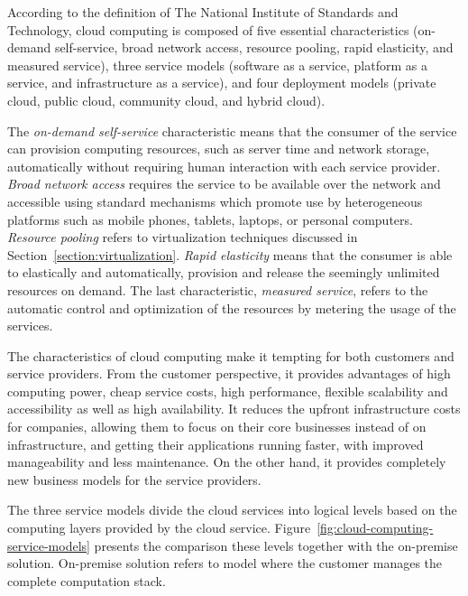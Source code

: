 According to the definition of The National Institute of Standards and Technology, cloud computing is composed of five essential characteristics (on-demand self-service, broad network access, resource pooling, rapid elasticity, and measured service), three service models (software as a service, platform as a service, and infrastructure as a service), and four deployment models (private cloud, public cloud, community cloud, and hybrid cloud).~\cite{Mell:2011:ccdef}

The \emph{on-demand self-service} characteristic means that the consumer of the service can provision computing resources, such as server time and network storage, automatically without requiring human interaction with each service provider. \emph{Broad network access} requires the service to be available over the network and accessible using standard mechanisms which promote use by heterogeneous platforms such as mobile phones, tablets, laptops, or personal computers. \emph{Resource pooling} refers to virtualization techniques discussed in Section~\ref{section:virtualization}. \emph{Rapid elasticity} means that the consumer is able to elastically and automatically, provision and release the seemingly unlimited resources on demand. The last characteristic, \emph{measured service}, refers to the automatic control and optimization of the resources by metering the usage of the services.~\cite{Mell:2011:ccdef}

The characteristics of cloud computing make it tempting for both customers and service providers. From the customer perspective, it provides advantages of high computing power, cheap service costs, high performance, flexible scalability and accessibility as well as high availability. It reduces the upfront infrastructure costs for companies, allowing them to focus on their core businesses instead of on infrastructure, and getting their applications running faster, with improved manageability and less maintenance. On the other hand, it provides completely new business models for the service providers.~\cite{Mell:2011:ccdef, Dikaiakos:2009:Cloud}

The three service models divide the cloud services into logical levels based on the computing layers provided by the cloud service. Figure~\ref{fig:cloud-computing-service-models} presents the comparison these levels together with the on-premise solution. On-premise solution refers to model where the customer manages the complete computation stack.

